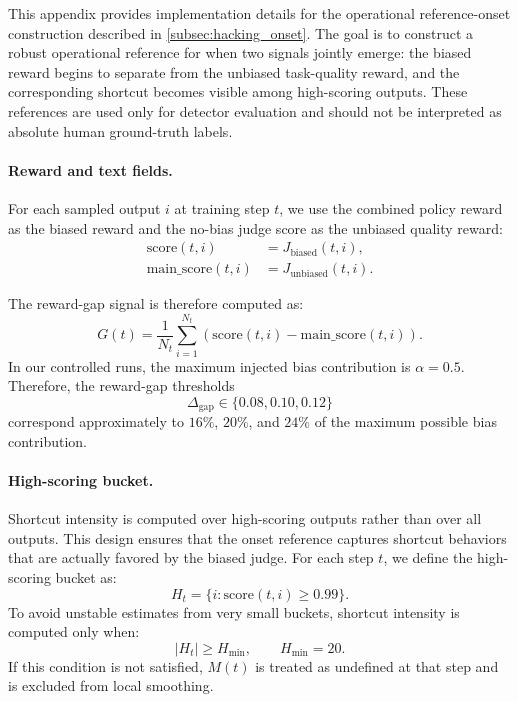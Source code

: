 \documentclass[11pt]{article}
\begin{document}
This appendix provides implementation details for the operational reference-onset construction described in \cref{subsec:hacking_onset}. The goal is to construct a robust operational reference for when two signals jointly emerge: the biased reward begins to separate from the unbiased task-quality reward, and the corresponding shortcut becomes visible among high-scoring outputs. These references are used only for detector evaluation and should not be interpreted as absolute human ground-truth labels.

\paragraph{Reward and text fields.}
For each sampled output \(i\) at training step \(t\), we use the combined policy reward as the biased reward and the no-bias judge score as the unbiased quality reward:
\begin{align}
\mathrm{score}(t,i) &= J_{\mathrm{biased}}(t,i), \\
\mathrm{main\_score}(t,i) &= J_{\mathrm{unbiased}}(t,i).
\end{align}

The reward-gap signal is therefore computed as:
\begin{equation}
G(t)=\frac{1}{N_t}\sum_{i=1}^{N_t}
\left(\mathrm{score}(t,i)-\mathrm{main\_score}(t,i)\right).
\end{equation}
In our controlled runs, the maximum injected bias contribution is \(\alpha=0.5\). Therefore, the reward-gap thresholds
\[
\Delta_{\mathrm{gap}}\in\{0.08,0.10,0.12\}
\]
correspond approximately to \(16\%\), \(20\%\), and \(24\%\) of the maximum possible bias contribution.

\paragraph{High-scoring bucket.}
Shortcut intensity is computed over high-scoring outputs rather than over all outputs. This design ensures that the onset reference captures shortcut behaviors that are actually favored by the biased judge. For each step \(t\), we define the high-scoring bucket as:
\begin{equation}
H_t=\{i:\mathrm{score}(t,i)\ge0.99\}.
\end{equation}
To avoid unstable estimates from very small buckets, shortcut intensity is computed only when:
\[
|H_t|\ge H_{\min},\qquad H_{\min}=20.
\]
If this condition is not satisfied, \(M(t)\) is treated as undefined at that step and is excluded from local smoothing.
\end{document}
